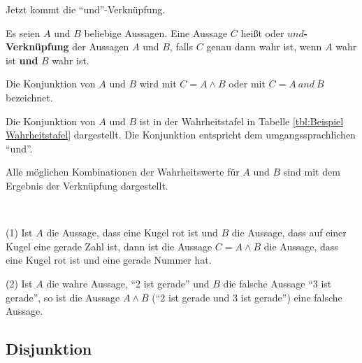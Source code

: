 \begin{Unit}[Konjunktion] Jetzt kommt die \enquote{und}-Verknüpfung.

\begin{Definition}
Es seien $A$ und $B$ beliebige Aussagen. Eine Aussage $C$ heißt
 oder \textbf{$und$-Verknüpfung}
 der Aussagen $A$ und $B$, falls $C$ genau dann wahr 
ist, wenn $A$ wahr ist \textbf{und} $B$ wahr ist. 
\end{Definition}

Die Konjunktion von $A$ und $B$ wird mit $C = A \land B$ oder mit 
$C = A\ and \ B$ bezeichnet. 

Die Konjunktion von $A$ und $B$ ist in der Wahrheitstafel in Tabelle
\ref{tbl:Beispiel Wahrheitstafel} dargestellt. Die Konjunktion entspricht 
dem umgangssprachlichen \enquote{und}.

Alle möglichen Kombinationen der Wahrheitswerte für $A$ und $B$ sind mit dem
Ergebnis der Verknüpfung dargestellt.
\end{Unit}

\begin{Unit}[Beispiel] \ 

(1) Ist $A$ die Aussage, dass eine Kugel rot ist und $B$ die Aussage, dass 
auf einer Kugel eine gerade Zahl ist, dann ist die Aussage $C = A \land B$ 
die Aussage, dass eine Kugel rot ist und eine gerade Nummer hat.

(2) Ist $A$ die wahre Aussage, \enquote{2 ist gerade} und $B$ die falsche 
Aussage \enquote{3 ist gerade}, so ist die Aussage $A \land B$ 
(\enquote{2 ist gerade und 3 ist gerade}) eine falsche Aussage.
\end{Unit}

\subsection*{Disjunktion}

